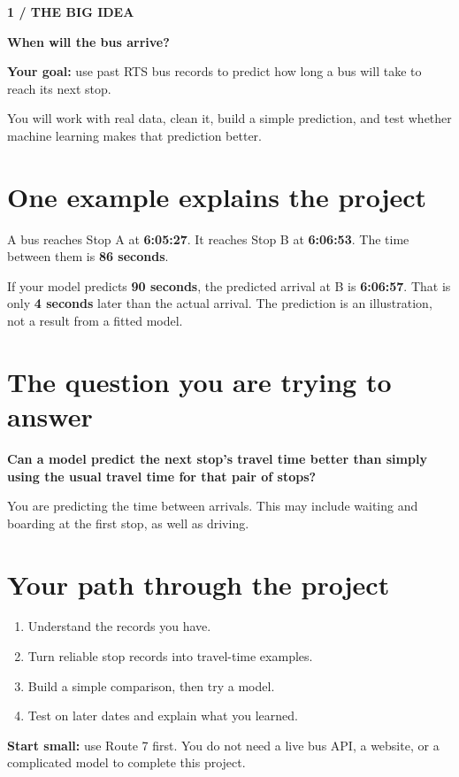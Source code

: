 \documentclass[11pt,letterpaper]{article}
\newcommand{\heading}[2]{{\small\color{accent}\textbf{#1}}\par{\LARGE\bfseries #2}\par\vspace{4pt}}
\begin{document}
\raggedright
\heading{1 / THE BIG IDEA}{When will the bus arrive?}
\textbf{Your goal:} use past RTS bus records to predict how long a bus will
take to reach its next stop.

You will work with real data, clean it, build a simple prediction, and test
whether machine learning makes that prediction better.

\section*{One example explains the project}
A bus reaches Stop A at \textbf{6:05:27}. It reaches Stop B at
\textbf{6:06:53}. The time between them is \textbf{86 seconds}.

\begin{center}
\end{center}

If your model predicts \textbf{90 seconds}, the predicted arrival at B is
\textbf{6:06:57}. That is only \textbf{4 seconds} later than the actual arrival.
The prediction is an illustration, not a result from a fitted model.

\section*{The question you are trying to answer}
\textbf{Can a model predict the next stop's travel time better than simply
using the usual travel time for that pair of stops?}

You are predicting the time between arrivals. This may include waiting and
boarding at the first stop, as well as driving.

\section*{Your path through the project}
\begin{enumerate}
\item Understand the records you have.
\item Turn reliable stop records into travel-time examples.
\item Build a simple comparison, then try a model.
\item Test on later dates and explain what you learned.
\end{enumerate}
\textbf{Start small:} use Route 7 first. You do not need a live bus API,
a website, or a complicated model to complete this project.
\end{document}
